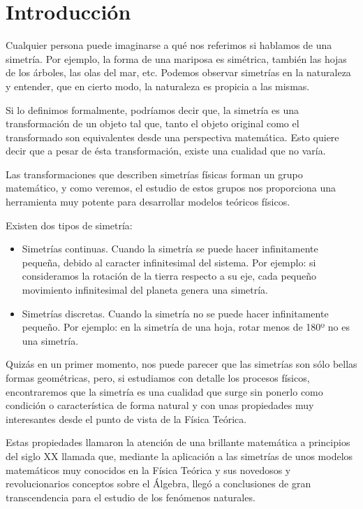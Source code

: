 \section{Introducción}\label{sec:introduccion}

Cualquier persona puede imaginarse a qué nos referimos si hablamos de una simetría. Por ejemplo, la forma de una mariposa es simétrica, también las hojas de los árboles, las olas del mar, etc. Podemos observar simetrías en la naturaleza y entender, que en cierto modo, la naturaleza es propicia a las mismas.

Si lo definimos formalmente, podríamos decir que, la simetría es una transformación de un objeto tal que, tanto el objeto original como el transformado son equivalentes desde una perspectiva matemática. Esto quiere decir que a pesar de ésta transformación, existe una cualidad que no varía.

Las transformaciones que describen simetrías físicas forman un grupo matemático, y como veremos, el estudio de estos grupos nos proporciona una herramienta muy potente para desarrollar modelos teóricos físicos.

Existen dos tipos de simetría:
\begin{itemize}
    \item Simetrías continuas. Cuando la simetría se puede hacer infinitamente pequeña,  debido al caracter infinitesimal del sistema. Por ejemplo: si consideramos la rotación de la tierra respecto a su eje, cada pequeño movimiento infinitesimal del planeta genera una simetría.

    \item Simetrías discretas. Cuando la simetría no se puede hacer infinitamente pequeño. Por ejemplo: en la simetría de una hoja, rotar menos de 180º no es una simetría.
\end{itemize}

Quizás en un primer momento, nos puede parecer que las simetrías son sólo bellas formas geométricas, pero, si estudiamos con detalle los procesos físicos, encontraremos que la simetría es una cualidad que surge sin ponerlo como condición o característica de forma natural y con unas propiedades muy interesantes desde el punto de vista de la Física Teórica.

Estas propiedades llamaron la atención de una brillante matemática a principios del siglo XX llamada  que, mediante la aplicación a las simetrías de unos modelos matemáticos muy conocidos en la Física Teórica y sus novedosos y revolucionarios conceptos sobre el Álgebra, llegó a conclusiones de gran transcendencia para el estudio de los fenómenos naturales.

